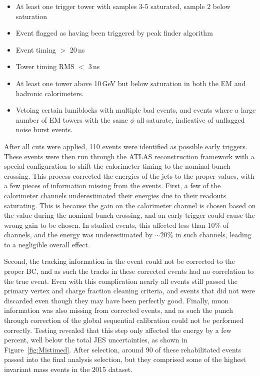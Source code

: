 \begin{itemize}[noitemsep]
	\item At least one trigger tower with samples 3-5 saturated, sample 2 below saturation
	\item Event flagged as having been triggered by peak finder algorithm
	\item Event timing $>$ 20\,ns
	\item Tower timing RMS $<$ 3\,ns
	\item At least one tower above 10\,GeV but below saturation in both the EM and hadronic calorimeters.
	\item Vetoing certain lumiblocks with multiple bad events, and events where a large number of EM towers with the same $\phi$ all saturate, indicative of unflagged noise burst events.
\end{itemize}

After all cuts were applied, 110 events were identified as possible early triggers.  These events were then run through the ATLAS reconstruction framework with a special configuration to shift the calorimeter timing to the nominal bunch crossing.  This process corrected the energies of the jets to the proper values, with a few pieces of information missing from the events.  First, a few of the calorimeter channels underestimated their energies due to their readouts saturating.  This is because the gain on the calorimeter channel is chosen based on the value during the nominal bunch crossing, and an early trigger could cause the wrong gain to be chosen.  In studied events, this affected less than 10\% of channels, and the energy was underestimated by $\sim20$\% in such channels, leading to a negligible overall effect.  

Second, the tracking information in the event could not be corrected to the proper BC, and as such the tracks in these corrected events had no correlation to the true event.  Even with this complication nearly all events still passed the primary vertex and charge fraction cleaning criteria, and events that did not were discarded even though they may have been perfectly good.  Finally, muon information was also missing from corrected events, and as such the punch through correction of the global sequential calibration could not be performed correctly.  Testing revealed that this step only affected the energy by a few percent, well below the total JES uncertainties, as shown in Figure~\ref{fig:Mistimed}. After selection, around 90 of these rehabilitated events passed into the final analysis selection, but they comprised some of the highest invariant mass events in the 2015 dataset.

